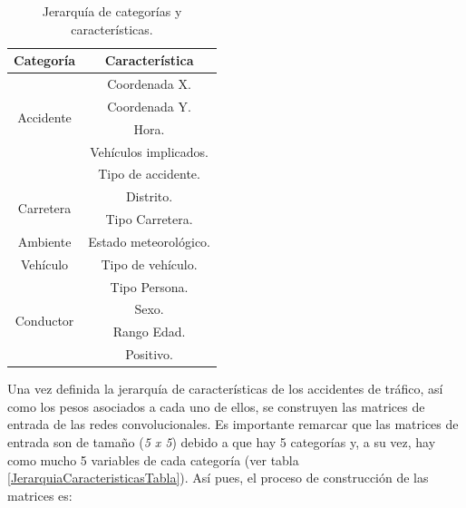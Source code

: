         \begin{table}[H]
          \small
          \centering
          \begin{tabular}{ |c|c| }
               \hline
               \textbf{Categoría} & \textbf{Característica}\\

               \hline
               \multirow{4}{*}{Accidente}            & Coordenada X.\\
                                                     & Coordenada Y.\\
                                                     & Hora.\\
                                                     & Vehículos implicados.\\
                                                     & Tipo de accidente.\\

               \hline
               \multirow{2}{*}{Carretera}            & Distrito.\\
                                                     & Tipo Carretera.\\


               \hline
               \multirow{1}{*}{Ambiente}             & Estado meteorológico.\\

               \hline
               \multirow{1}{*}{Vehículo}             & Tipo de vehículo.\\

               \hline
               \multirow{4}{*}{Conductor}            & Tipo Persona.\\
                                                     & Sexo.\\
                                                     & Rango Edad.\\
                                                     & Positivo.\\

               \hline
          \end{tabular}
          \caption{Jerarquía de categorías y características.}
          \label{JerarquiaCaracteristicasTabla}
        \end{table}



        Una vez definida la jerarquía de características de los accidentes de tráfico, así como los pesos asociados a cada uno de ellos, se construyen las matrices de entrada de las redes convolucionales. Es importante remarcar que las matrices de entrada son de tamaño (\textit{5 x 5}) debido a que hay 5 categorías y, a su vez, hay como mucho 5 variables de cada categoría (ver tabla \eqref{JerarquiaCaracteristicasTabla}). Así pues, el proceso de construcción de las matrices es:

